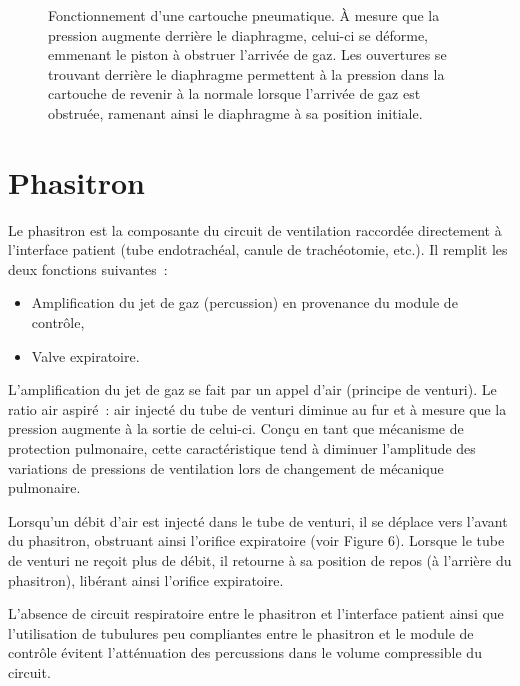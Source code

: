 \begin{figure}
	
\caption{Fonctionnement d'une cartouche pneumatique. À mesure que la pression augmente derrière le diaphragme, celui-ci se déforme, emmenant  le piston à obstruer l’arrivée de gaz. Les ouvertures se trouvant derrière le diaphragme permettent à la pression dans la cartouche de revenir à la normale lorsque l’arrivée de gaz est obstruée, ramenant ainsi le diaphragme à sa position initiale.}
\end{figure}


\section{Phasitron}
Le phasitron est la composante du circuit de ventilation raccordée directement à l’interface patient (tube endotrachéal, canule de trachéotomie, etc.). Il remplit les deux fonctions suivantes : \begin{itemize}
	\item Amplification du jet de gaz (percussion) en provenance du module de contrôle,
	\item Valve expiratoire.
\end{itemize}

L’amplification du jet de gaz se fait par un appel d’air (principe de venturi). Le ratio air aspiré : air injecté du tube de venturi diminue au fur et à mesure que la pression augmente à la sortie de celui-ci. Conçu en tant que mécanisme de protection pulmonaire, cette caractéristique tend à diminuer l’amplitude des variations de pressions de ventilation lors de changement de mécanique pulmonaire.

Lorsqu’un débit d’air est injecté dans le tube de venturi, il se déplace vers l’avant du phasitron, obstruant ainsi l’orifice expiratoire (voir Figure 6). Lorsque le tube de venturi ne reçoit plus de débit, il retourne à sa position de repos (à l’arrière du phasitron), libérant ainsi l’orifice expiratoire.

L’absence de circuit respiratoire entre le phasitron et l’interface patient ainsi que l’utilisation de tubulures peu compliantes entre le phasitron et le module de contrôle évitent l’atténuation des percussions dans le volume compressible du circuit.


